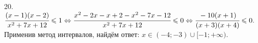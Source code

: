 20. $\cfrac{(x-1)(x-2)}{x^2+7x+12}\leqslant1\Leftrightarrow \cfrac{x^2-2x-x+2-x^2-7x-12}{x^2+7x+12}\leqslant0
\Leftrightarrow \cfrac{-10(x+1)}{(x+3)(x+4)}\leqslant0.$ Применив метод интервалов, найдём ответ: $x\in(-4;-3)\cup[-1;+\infty).$
\begin{figure}[ht!]
\end{figure}\\
